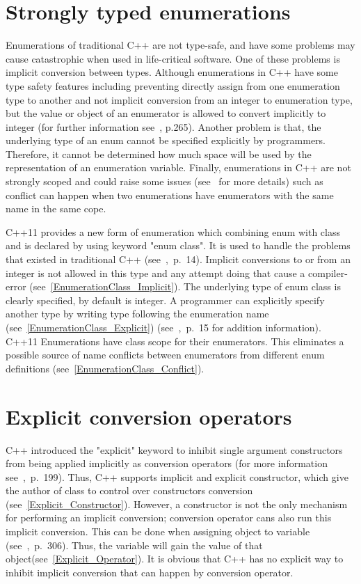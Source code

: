 \documentclass[11pt]{report}
\begin{document}
\section{Strongly typed enumerations}
\label{section: Strongly typed enumerations}
Enumerations of traditional C++ are not type-safe, and have some problems may cause catastrophic when used in life-critical software. One of these problems is implicit conversion between types. Although enumerations in C++ have some type safety features including preventing directly assign from one enumeration type to another and not implicit conversion from an integer to enumeration type, but the value or object of an enumerator is allowed to convert implicitly to integer (for further information see~\cite{Overland:2011:CWF}, p.265). Another problem is that, the underlying type of an enum cannot be specified explicitly by programmers. Therefore, it cannot be determined how much space will be used by the representation of an enumeration variable. Finally, enumerations in C++ are not strongly scoped and could raise some issues (see~\cite{Stroustrup:2012:Cpp11} for more details) such as conflict can happen when two enumerations have enumerators with the same name in the same cope.

C++11 provides a new form of enumeration which combining enum with class and is declared by using keyword "enum class". It is used to handle the problems that existed in traditional C++ (see~\cite{Gregorie:professionalcpp},~p.~14).  Implicit conversions to or from an integer is not allowed in this type and any attempt doing that cause a compiler-error (see~\ref{EnumerationClass_Implicit}). The underlying type of enum class is clearly specified, by default is integer. A programmer can explicitly specify another type by writing type following the enumeration name (see~\ref{EnumerationClass_Explicit}) (see~\cite{Gregorie:professionalcpp},~p.~15 for addition information). C++11 Enumerations have class scope for their enumerators. This eliminates a possible source of name conflicts between enumerators from different enum definitions (see~\ref{EnumerationClass_Conflict}).

\section{Explicit conversion operators}
\label{section: Explicit Conversion Operators}
C++ introduced the "explicit" keyword to inhibit single argument constructors from being applied implicitly as conversion operators (for more information see~\cite{Gregorie:professionalcpp},~p.~199). Thus, C++ supports implicit and explicit constructor, which give the author of class to control over constructors conversion (see~\ref{Explicit_Constructor}). However, a constructor is not the only mechanism for performing an implicit conversion; conversion operator cans also run this implicit conversion. This can be done when assigning object to variable (see~\cite{Gregorie:professionalcpp},~p.~306). Thus, the variable will gain the value of that object(see~\ref{Explicit_Operator}). It is obvious that C++ has no explicit way to inhibit implicit conversion that can happen by conversion operator.
\end{document}
